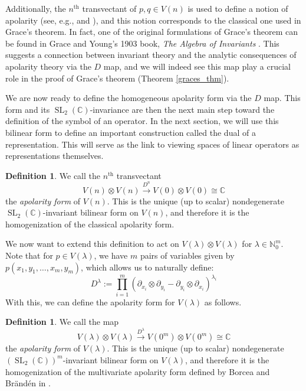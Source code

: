 \documentclass{article}
\theoremstyle{definition}
\newtheorem{definition}[theorem]{Definition}
\theoremstyle{plain}
\newcommand{\C}{\mathbb{C}}
\newcommand{\N}{\mathbb{N}}
\DeclareMathOperator{\SL}{SL}
\begin{document}
Additionally, the $n^\text{th}$ transvectant of $p,q \in V(n)$ is used to define a notion of apolarity (see, e.g., \cite{rota1993apolarity} and \cite{brennan2007apolarity}), and this notion corresponds to the classical one used in Grace's theorem. In fact, one of the original formulations of Grace's theorem can be found in Grace and Young's 1903 book, \emph{The Algebra of Invariants} \cite{grace1903invariants}. This suggests a connection between invariant theory and the analytic consequences of apolarity theory via the $D$ map, and we will indeed see this map play a crucial role in the proof of Grace's theorem (Theorem \ref{graces_thm}).

We are now ready to define the homogeneous apolarity form via the $D$ map. This form and its $\SL_2(\C)$-invariance are then the next main step toward the definition of the symbol of an operator. In the next section, we will use this bilinear form to define an important construction called the dual of a representation. This will serve as the link to viewing spaces of linear operators as representations themselves.

\begin{definition}\label{Uform_def}
    We call the $n^\text{th}$ transvectant
    \[
        V(n) \otimes V(n) \xrightarrow{D^n} V(0) \otimes V(0) \cong \C
    \]
    the \emph{apolarity form} of $V(n)$. This is the unique (up to scalar) nondegenerate $\SL_2(\C)$-invariant bilinear form on $V(n)$, and therefore it is the homogenization of the classical apolarity form.
\end{definition}

We now want to extend this definition to act on $V(\lambda) \otimes V(\lambda)$ for $\lambda \in \N_0^m$. Note that for $p \in V(\lambda)$, we have $m$ pairs of variables given by $p(x_1,y_1,\ldots,x_m,y_m)$, which allows us to naturally define:
\[
    D^\lambda := \prod_{i=1}^m (\partial_{x_i} \otimes \partial_{y_i} - \partial_{y_i} \otimes \partial_{x_i})^{\lambda_i}
\]
With this, we can define the apolarity form for $V(\lambda)$ as follows.

\begin{definition}\label{Mform_def}
    We call the map
    \[
        V(\lambda) \otimes V(\lambda) \xrightarrow{D^\lambda} V(0^m) \otimes V(0^m) \cong \C
    \]
    the \emph{apolarity form} of $V(\lambda)$. This is the unique (up to scalar) nondegenerate $(\SL_2(\C))^m$-invariant bilinear form on $V(\lambda)$, and therefore it is the homogenization of the multivariate apolarity form defined by Borcea and Br{\"a}nd{\'e}n in \cite{bb2}.
\end{definition}
\end{document}
